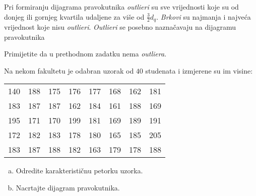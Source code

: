 \documentclass[12pt]{scrartcl}
\begin{document}
\begin{napomena}
 Pri formiranju dijagrama pravokutnika \textsl{outlieri} su sve vrijednosti koje su od donjeg ili gornjeg kvartila udaljene za više od $\frac{3}{2}d_q$. \emph{Brkovi} su najmanja i najveća vrijednost koje nisu \textsl{outlieri}. \textsl{Outlieri} se posebno naznačavaju na dijagramu pravokutnika
\end{napomena}
\noindent Primijetite da u prethodnom zadatku nema \textsl{outliera}.
\begin{zadatak}
Na nekom fakultetu je odabran uzorak od $40$ studenata i izmjerene su im visine:
\begin{center}
\begin{tabular}{llllllll}
140 & 188 & 175 & 176 & 177 & 168 & 162 & 181 \\
183 & 187 & 187 & 162 & 184 & 161 & 188 & 169 \\
195 & 171 & 170 & 199 & 181 & 169 & 189 & 191 \\
172 & 182 & 183 & 178 & 180 & 165 & 185 & 205 \\
183 & 187 & 188 & 182 & 163 & 179 & 178 & 188
\end{tabular}
\end{center}

\begin{enumerate}[(a)]
    \item Odredite karakterističnu petorku uzorka.
    \item Nacrtajte dijagram pravokutnika.
\end{enumerate}
\end{zadatak}
\end{document}
